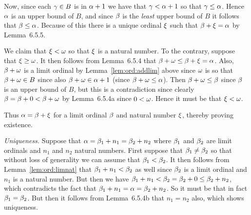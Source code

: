 {{    Now, since each $\gamma \in B$ is in $\alpha+1$ we have that $\gamma < \alpha+1$ so that $\gamma \leq \alpha$.
    Hence $\alpha$ is an upper bound of $B$, and since $\beta$ is the \emph{least} upper bound of $B$ it follows that $\beta \leq \alpha$.
    Because of this there is a unique ordinal $\xi$ such that $\beta + \xi = \alpha$ by Lemma~6.5.5.

    We claim that $\xi < \omega$ so that $\xi$ is a natural number.
    To the contrary, suppose that $\xi \geq \omega$.
    It then follows from Lemma~6.5.4 that  $\beta + \omega \leq \beta + \xi = \alpha$.
    Also, $\beta + \omega$ is a limit ordinal by Lemma~\ref{lem:ord:addlim} above since $\omega$ is so that $\beta+\omega \in B$ since also $\beta + \omega \in \alpha+1$ (since $\beta+\omega \leq \alpha$).
    Then $\beta + \omega \leq \beta$ since $\beta$ is an upper bound of $B$, but this is a contradiction since clearly $\beta = \beta + 0 < \beta + \omega$ by Lemma~6.5.4a since $0 < \omega$.
    Hence it must be that $\xi < \omega$.

    Thus $\alpha = \beta + \xi$ for a limit ordinal $\beta$ and natural number $\xi$, thereby proving existence.

    \emph{Uniqueness.}
    Suppose that $\alpha = \beta_1 + n_1 = \beta_2 + n_2$ where $\beta_1$ and $\beta_2$ are limit ordinals and $n_1$ and $n_2$ natural numbers.
    First suppose that $\beta_1 \neq \beta_2$ so that without loss of generality we can assume that $\beta_1 < \beta_2$.
    It then follows from Lemma~\ref{lem:ord:limnat} that $\beta_1 + n_1 < \beta_2$ as well since $\beta_2$ is a limit ordinal and $n_1$ is a natural number.
    But then we have $\beta_1 + n_1 < \beta_2 = \beta_2 + 0 \leq \beta_2 + n_2$, which contradicts the fact that $\beta_1 + n_1 = \alpha = \beta_2 + n_2$.
    So it must be that in fact $\beta_1 = \beta_2$.
    But then it follows from Lemma~6.5.4b that $n_1 = n_2$ also, which shows uniqueness.
  }
}

